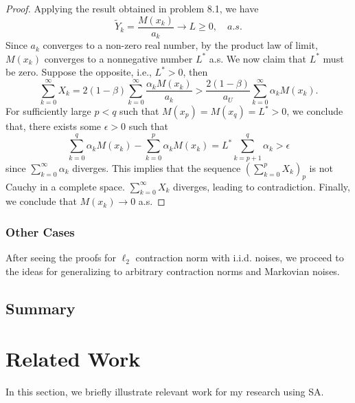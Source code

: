 \documentclass[11pt,twoside]{article}
\begin{document}
\begin{proof}
    Applying the result obtained in problem 8.1, we have
    \[
    \tilde Y_{k} = \frac{M(x_k)}{a_k} \to L \geq 0, \quad{a.s.}
    \]
    Since $a_k$ converges to a non-zero real number, by the product law of limit, $M(x_k)$ converges to a nonnegative number $L^*$ a.s. We now claim that $L^*$ must be zero. Suppose the opposite, i.e.,  $L^* > 0$, then 
    \[
    \sum_{k=0}^\infty X_k = 2(1-\beta)\sum_{k=0}^\infty\frac{\alpha_k M(x_k)}{a_k} > \frac{2(1-\beta)}{a_U}\sum_{k=0}^\infty{\alpha_k M(x_k)}.
    \]
    For sufficiently large $p<q$ such that $M(x_p) = M(x_q) = L^* > 0$, we conclude that, there exists some $\epsilon > 0$ such that 
    \[
    \sum_{k=0}^q{\alpha_k M(x_k)} - \sum_{k=0}^p{\alpha_k M(x_k)} = L^* \sum_{k=p+1}^q\alpha_k > \epsilon 
    \]
    since $\sum_{k=0}^\infty \alpha_k$ diverges. This implies that the sequence $(\sum_{k=0}^p X_k)_p$ is not Cauchy in a complete space. $\sum_{k=0}^\infty X_k$ diverges, leading to contradiction. Finally, we conclude that $M(x_k) \to 0$ a.s.
\end{proof}
\clearpage
\subsubsection{Other Cases}
After seeing the proofs for $\ell_2$ contraction norm with i.i.d. noises, we proceed to the ideas for generalizing to arbitrary contraction norms and Markovian noises.

\subsection{Summary}

\section{Related Work}
In this section, we briefly illustrate relevant work for my research using SA.

\clearpage


\end{document}
